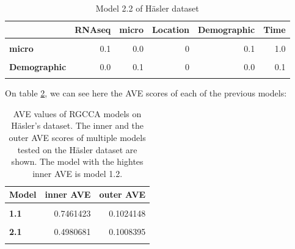 \documentclass[
  a4paper,
]{book}
\begin{document}
\begin{table}[H]

\caption[Model 2.2 of Häsler dataset]{\label{tab:hasler-model-2-2}Model 2.2 of Häsler dataset}
\centering
\begin{tabular}[t]{>{}l||r|r|r|r|r}
\hline
  & RNAseq & micro & Location & Demographic & Time\\
\hline
\textbf{\cellcolor{gray!6}{RNAseq}} & \cellcolor{gray!6}{0.0} & \cellcolor{gray!6}{0.1} & \cellcolor{gray!6}{1} & \cellcolor{gray!6}{0.0} & \cellcolor{gray!6}{0.0}\\
\hline
\textbf{micro} & 0.1 & 0.0 & 0 & 0.1 & 1.0\\
\hline
\textbf{\cellcolor{gray!6}{Location}} & \cellcolor{gray!6}{1.0} & \cellcolor{gray!6}{0.0} & \cellcolor{gray!6}{0} & \cellcolor{gray!6}{0.0} & \cellcolor{gray!6}{0.0}\\
\hline
\textbf{Demographic} & 0.0 & 0.1 & 0 & 0.0 & 0.1\\
\hline
\textbf{\cellcolor{gray!6}{Time}} & \cellcolor{gray!6}{0.0} & \cellcolor{gray!6}{1.0} & \cellcolor{gray!6}{0} & \cellcolor{gray!6}{0.1} & \cellcolor{gray!6}{0.0}\\
\hline
\end{tabular}
\end{table}

On table \ref{tab:hasler-aves}, we can see here the AVE scores of each of the previous models:

\begin{table}[H]

\caption[AVE values of RGCCA models on Häsler's dataset]{\label{tab:hasler-aves}AVE values of RGCCA models on Häsler's dataset. The inner and the outer AVE scores of multiple models tested on the Häsler dataset are shown. The model with the hightes inner AVE is model 1.2.}
\centering
\begin{tabular}[t]{>{}l||r|r}
\hline
Model & inner AVE & outer AVE\\
\hline
\textbf{\cellcolor{gray!6}{0}} & \cellcolor{gray!6}{0.8217371} & \cellcolor{gray!6}{0.0961236}\\
\hline
\textbf{1.1} & 0.7461423 & 0.1024148\\
\hline
\textbf{\cellcolor{gray!6}{1.2}} & \cellcolor{gray!6}{0.8349410} & \cellcolor{gray!6}{0.1025486}\\
\hline
\textbf{2.1} & 0.4980681 & 0.1008395\\
\hline
\textbf{\cellcolor{gray!6}{2.2}} & \cellcolor{gray!6}{0.7513065} & \cellcolor{gray!6}{0.1009915}\\
\hline
\end{tabular}
\end{table}
\end{document}
